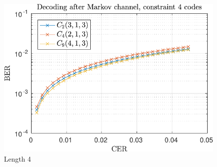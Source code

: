 \begin{figure}
\centering
\includegraphics[scale=1]{../figures/const4markov.pdf} 
\caption{Length 4\label{fig:constantContraintMarkovFigure}}
\end{figure}